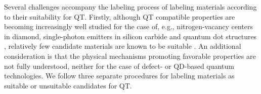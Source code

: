 \documentclass[superscriptaddress,unsortedaddress,
 amsmath,amssymb,
 aps,
]{revtex4-2}
\begin{document}
Several challenges accompany the labeling process of labeling materials according to their suitability for QT. 
Firstly, although QT compatible properties are becoming increasingly well studied for the case of, e.g., nitrogen-vacancy centers in diamond, single-photon emitters in silicon carbide and quantum dot structures \cite{Doherty_2013,Bathen2021,Aharonovich_2016}, relatively few candidate materials are known to be suitable \cite{Atatuere2018,Zhang2020}. An additional consideration is that the physical mechanisms promoting favorable properties are not fully understood, neither for the case of defect- or QD-based quantum technologies. 
We follow three separate procedures for labeling materials as suitable or unsuitable candidates for QT. 
\end{document}
